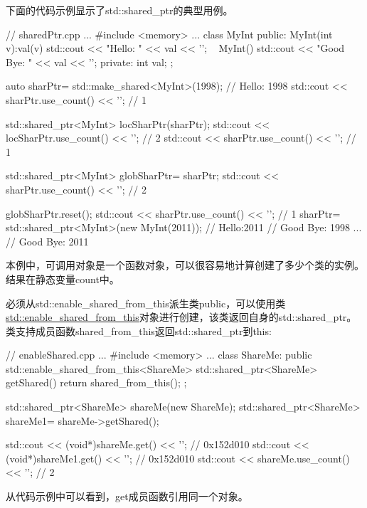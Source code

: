 下面的代码示例显示了std::shared\_ptr的典型用例。


\begin{cpp}
// sharedPtr.cpp
...
#include <memory>
...
class MyInt{
public:
	MyInt(int v):val(v){
		std::cout << "Hello: " << val << '\n';
	} ~
	MyInt(){
		std::cout << "Good Bye: " << val << '\n';
	}
private:
	int val;
};

auto sharPtr= std::make_shared<MyInt>(1998); // Hello: 1998
std::cout << sharPtr.use_count() << '\n'; // 1

{
	std::shared_ptr<MyInt> locSharPtr(sharPtr);
	std::cout << locSharPtr.use_count() << '\n'; // 2
}
std::cout << sharPtr.use_count() << '\n'; // 1

std::shared_ptr<MyInt> globSharPtr= sharPtr;
std::cout << sharPtr.use_count() << '\n'; // 2

globSharPtr.reset();
std::cout << sharPtr.use_count() << '\n'; // 1
sharPtr= std::shared_ptr<MyInt>(new MyInt(2011)); // Hello:2011
												  // Good Bye: 1998
...
// Good Bye: 2011
\end{cpp}

本例中，可调用对象是一个函数对象，可以很容易地计算创建了多少个类的实例。结果在静态变量count中。


必须从std::enable\_shared\_from\_this派生类public，可以使用类\href{http://en.cppreference.com/w/cpp/memory/enable_shared_from_this}{std::enable\_shared\_from\_this}对象进行创建，该类返回自身的std::shared\_ptr。类支持成员函数shared\_from\_this返回std::shared\_ptr到this:


\begin{cpp}
// enableShared.cpp
...
#include <memory>
...
class ShareMe: public std::enable_shared_from_this<ShareMe>{
	std::shared_ptr<ShareMe> getShared(){
		return shared_from_this();
	}
};

std::shared_ptr<ShareMe> shareMe(new ShareMe);
std::shared_ptr<ShareMe> shareMe1= shareMe->getShared();

std::cout << (void*)shareMe.get() << '\n'; // 0x152d010
std::cout << (void*)shareMe1.get() << '\n'; // 0x152d010
std::cout << shareMe.use_count() << '\n'; // 2
\end{cpp}

从代码示例中可以看到，get成员函数引用同一个对象。


